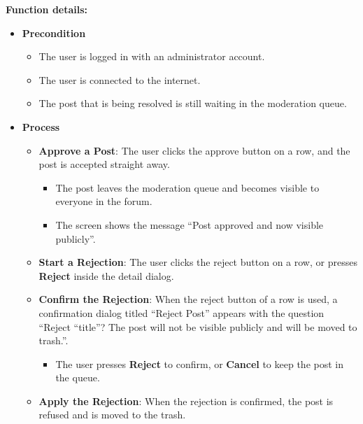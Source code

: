 \textbf{Function details:}
\begin{itemize}[leftmargin=1.6em,topsep=4pt,itemsep=3pt,parsep=0pt,label=$\bullet$]
    \item \textbf{Precondition}
        \begin{itemize}[leftmargin=2.2em,topsep=2pt,itemsep=3pt,parsep=0pt,label=$\circ$]
            \item The user is logged in with an administrator account.
            \item The user is connected to the internet.
            \item The post that is being resolved is still waiting in the moderation queue.
        \end{itemize}
    \item \textbf{Process}
        \begin{itemize}[leftmargin=2.2em,topsep=2pt,itemsep=3pt,parsep=0pt,label=$\circ$]
            \item \textbf{Approve a Post}: The user clicks the approve button on a row, and the post is accepted straight away.
                \begin{itemize}[leftmargin=2.2em,topsep=2pt,itemsep=3pt,parsep=0pt,label=$\blacksquare$]
                    \item The post leaves the moderation queue and becomes visible to everyone in the forum.
                    \item The screen shows the message ``Post approved and now visible publicly''.
                \end{itemize}
            \item \textbf{Start a Rejection}: The user clicks the reject button on a row, or presses \textbf{Reject} inside the detail dialog.
            \item \textbf{Confirm the Rejection}: When the reject button of a row is used, a confirmation dialog titled ``Reject Post'' appears with the question ``Reject ``title''? The post will not be visible publicly and will be moved to trash.''.
                \begin{itemize}[leftmargin=2.2em,topsep=2pt,itemsep=3pt,parsep=0pt,label=$\blacksquare$]
                    \item The user presses \textbf{Reject} to confirm, or \textbf{Cancel} to keep the post in the queue.
                \end{itemize}
            \item \textbf{Apply the Rejection}: When the rejection is confirmed, the post is refused and is moved to the trash.

\end{itemize}
\end{itemize}
